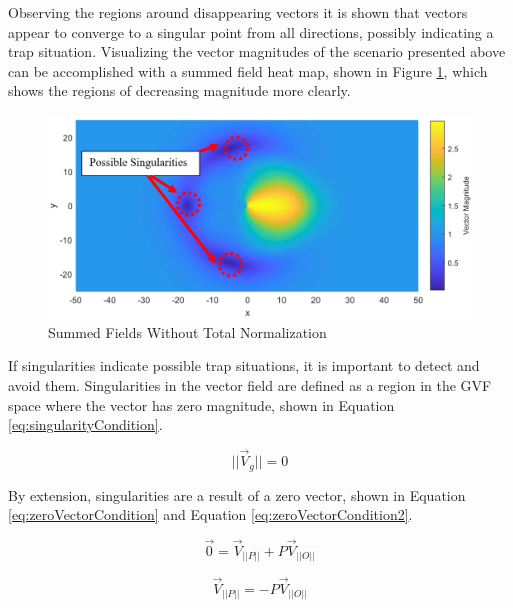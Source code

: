 \documentclass[numbered,pdftex]{ohio-etd}
\begin{document}
Observing the regions around disappearing vectors it is shown that vectors appear to converge to a singular point from all directions, possibly indicating a trap situation. Visualizing the vector magnitudes of the scenario presented above can be accomplished with a summed field heat map, shown in Figure \ref{fig:summedHeatMap}, which shows the regions of decreasing magnitude more clearly. 


\begin{figure}[H]
	\centering
	\includegraphics[trim=0 0 0 0,clip,width=14cm]{Figures/methods/summedHeatMapSimple2}
	\caption{Summed Fields Without Total Normalization}
	\label{fig:summedHeatMap}
\end{figure}

If singularities indicate possible trap situations, it is important to detect and avoid them. Singularities in the vector field are defined as a region in the GVF space where the vector has zero magnitude, shown in Equation \ref{eq:singularityCondition}.


\begin{equation}
\label{eq:singularityCondition}
||\overrightarrow{V}_g || = 0
\end{equation}

\noindent
By extension, singularities are a result of a zero vector, shown in Equation \ref{eq:zeroVectorCondition} and Equation \ref{eq:zeroVectorCondition2}.



\begin{equation}
\label{eq:zeroVectorCondition}
\overrightarrow{0} = \overrightarrow{V}_{||P||} +P\overrightarrow{V}_{||O||}
\end{equation}

\begin{equation}
\label{eq:zeroVectorCondition2}
\overrightarrow{V}_{||P||}=-P\overrightarrow{V}_{||O||}
\end{equation}
\end{document}
